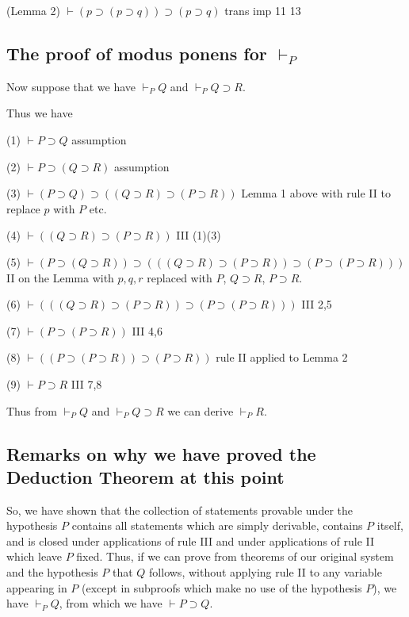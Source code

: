 \documentclass[12pt]{article}
\begin{document}
(Lemma 2) $\vdash (p \supset(p \supset q)) \supset (p \supset q)$  trans imp 11 13

\subsection{The proof of modus ponens for $\vdash_P$}


Now suppose that we have $\vdash_PQ$ and $\vdash_PQ \supset R$.

Thus we have

(1) $\vdash P \supset Q$  assumption

(2) $\vdash P \supset (Q \supset R)$  assumption

(3) $\vdash (P \supset Q) \supset ((Q \supset R) \supset (P \supset R))$  Lemma 1 above with rule II to replace $p$ with $P$ etc.

(4) $\vdash ((Q \supset R) \supset (P \supset R))$ III (1)(3)

(5)  $\vdash (P \supset (Q \supset R)) \supset (((Q \supset R) \supset (P \supset R)) \supset (P \supset (P \supset R)))$  II on the Lemma with $p,q,r$ replaced with $P$, $Q \supset R$, $P \supset R$.

(6) $\vdash (((Q \supset R) \supset (P \supset R)) \supset (P \supset (P \supset R)))$  III 2,5

(7)  $\vdash (P \supset (P \supset R))$  III 4,6

(8) $\vdash ((P \supset (P \supset R)) \supset (P \supset R))$ rule II applied to Lemma 2

(9) $\vdash P \supset R$ III 7,8

Thus from $\vdash_P Q$ and $\vdash_P Q \supset R$ we can derive $\vdash_PR$.

\subsection{Remarks on why we have proved the Deduction Theorem at this point}

So, we have shown that the collection of statements provable under the hypothesis $P$ contains all statements which are simply derivable,
contains $P$ itself, and is closed under applications of rule III and under applications of rule II which leave $P$ fixed.  Thus, if we can prove from
theorems of our original system and the hypothesis $P$ that $Q$ follows, without applying rule II to any variable appearing in $P$ (except in subproofs which make no use of the hypothesis $P$), we have $\vdash_P Q$, from which we have $\vdash P \supset Q$.
\end{document}
